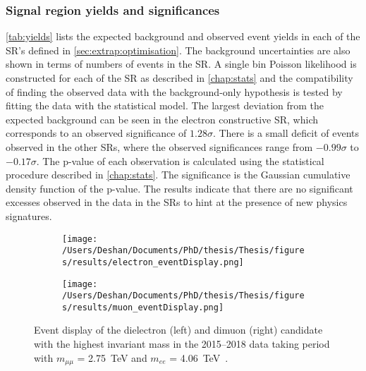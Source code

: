\subsubsection{Signal region yields and significances}
\cref{tab:yields} lists the expected background and observed event yields in each of the SR's defined in \cref{sec:extrap:optimisation}. The background uncertainties are also shown in terms of numbers of events in the SR. A single bin Poisson likelihood is constructed for each of the SR as described in \cref{chap:stats} and the compatibility of finding the observed data with the background-only hypothesis is tested by fitting the data with the statistical model. The largest deviation from the expected background can be seen in the electron constructive SR, which corresponds to an observed significance of $1.28\sigma$. There is a small deficit of events observed in the other SRs, where the observed significances range from $-0.99\sigma$ to $-0.17\sigma$. The p-value of each observation is calculated using the statistical procedure described in \cref{chap:stats}. The significance is the Gaussian cumulative density function of the p-value. The results indicate that there are no significant excesses observed in the data in the SRs to hint at the presence of new physics signatures. 

\begin{figure}[!htpb]
    \centering
    \begin{subfigure}[b]{0.49\textwidth}
        \centering
        \texttt{[image: /Users/Deshan/Documents/PhD/thesis/Thesis/figures/results/electron\_eventDisplay.png]}
        \label{fig:eventDisplay1}
    \end{subfigure}
    \begin{subfigure}[b]{0.49\textwidth}
        \centering
        \texttt{[image: /Users/Deshan/Documents/PhD/thesis/Thesis/figures/results/muon\_eventDisplay.png]}
        \label{fig:eventDisplay2}
    \end{subfigure}
    \caption[Event display of the dielectron and dimuon candidate with the highest invariant mass in the 2015--2018 data taking period]{
    Event display of the dielectron (left) and dimuon (right) candidate with the highest invariant mass in the 2015--2018 data taking period with $m_{\mu\mu}$ = \SI{2.75}{\tera\electronvolt} and $m_{ee}$ = \SI{4.06}{\tera\electronvolt}~\cite{Aad:2019fac}.
    }
    \label{fig:eventDisplay}
\end{figure}

